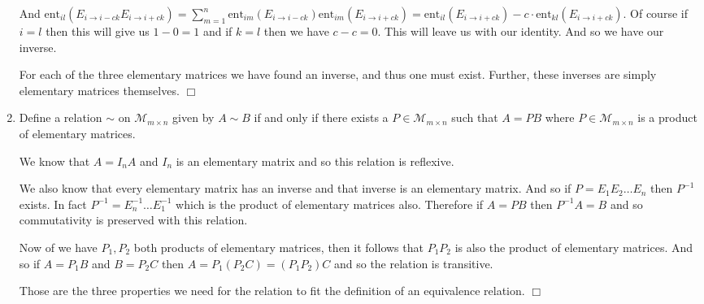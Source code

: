 \documentclass[letterpaper]{article}
\begin{document}
\begin{enumerate}
And $\text{ent}_{il}(E_{i\to i-ck}E_{i\to i+ck})=\sum\limits_{m=1}^n{\text{ent}_{im}(E_{i\to i-ck})\text{ent}_{im}(E_{i\to i+ck})}=\text{ent}_{il}(E_{i\to i+ck})-c\cdot\text{ent}_{kl}(E_{i\to i+ck})$. Of course if $i=l$ then this will give us $1-0=1$ and if $k=l$ then we have $c-c=0$. This will leave us with our identity. And so we have our inverse.

For each of the three elementary matrices we have found an inverse, and thus one must exist. Further, these inverses are simply elementary matrices themselves.
$\Box$
\item
Define a relation $\sim$ on $\mathcal{M}_{m\times n}$ given by $A\sim B$ if and only if there exists a $P\in \mathcal{M}_{m\times n}$ such that $A=PB$ where $P\in \mathcal{M}_{m\times n}$ is a product of elementary matrices.

We know that $A=I_nA$ and $I_n$ is an elementary matrix and so this relation is reflexive.

We also know that every elementary matrix has an inverse and that inverse is an elementary matrix. And so if $P=E_1E_2\dots E_n$ then $P^{-1}$ exists. In fact $P^{-1}=E_n^{-1}\dots E_1^{-1}$ which is the product of elementary matrices also. Therefore if $A=PB$ then $P^{-1}A=B$ and so commutativity is preserved with this relation.

Now of we have $P_1,P_2$ both products of elementary matrices, then it follows that $P_1P_2$ is also the product of elementary matrices. And so if $A=P_1B$ and $B=P_2C$ then $A=P_1(P_2C)=(P_1P_2)C$ and so the relation is transitive.

Those are the three properties we need for the relation to fit the definition of an equivalence relation.
$\Box$
\end{enumerate}
\end{document}
